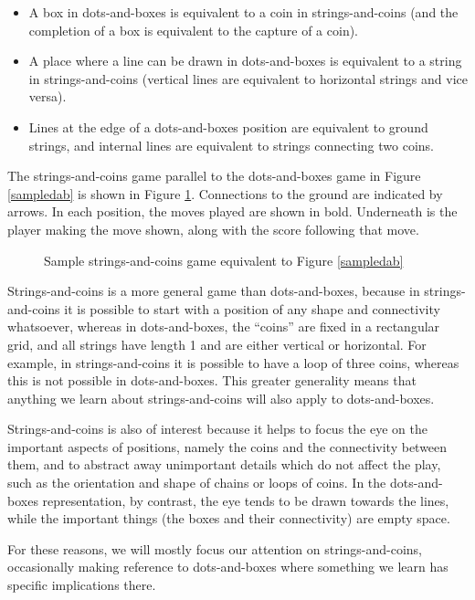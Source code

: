\documentclass[a4paper,twocolumn]{article}
\begin{document}
\begin{itemize}
\item A box in dots-and-boxes is equivalent to a coin in
  strings-and-coins (and the completion of a box is equivalent to the
  capture of a coin).
\item A place where a line can be drawn in dots-and-boxes is
  equivalent to a string in strings-and-coins (vertical lines are
  equivalent to horizontal strings and vice versa).
\item Lines at the edge of a dots-and-boxes position are equivalent to
  ground strings, and internal lines are equivalent to strings
  connecting two coins.
\end{itemize}

The strings-and-coins game parallel to the dots-and-boxes game in
Figure \ref{sampledab} is shown in Figure \ref{samplesnc}. Connections
to the ground are indicated by arrows. In each position, the moves
played are shown in bold. Underneath is the player making the move
shown, along with the score following that move.

\begin{figure}
  \centering
  \def\svgscale{0.7}
  
  \caption{Sample strings-and-coins game equivalent to Figure \ref{sampledab}}
  \label{samplesnc}
\end{figure}

Strings-and-coins is a more general game than dots-and-boxes, because
in strings-and-coins it is possible to start with a position of any
shape and connectivity whatsoever, whereas in dots-and-boxes, the
``coins'' are fixed in a rectangular grid, and all strings have length
1 and are either vertical or horizontal. For example, in
strings-and-coins it is possible to have a loop of three coins,
whereas this is not possible in dots-and-boxes. This greater
generality means that anything we learn about strings-and-coins will
also apply to dots-and-boxes.

Strings-and-coins is also of interest because it helps to focus the
eye on the important aspects of positions, namely the coins and the
connectivity between them, and to abstract away unimportant details
which do not affect the play, such as the orientation and shape of
chains or loops of coins. In the dots-and-boxes representation, by
contrast, the eye tends to be drawn towards the lines, while the
important things (the boxes and their connectivity) are empty space.

For these reasons, we will mostly focus our attention on
strings-and-coins, occasionally making reference to dots-and-boxes
where something we learn has specific implications there.
\end{document}
